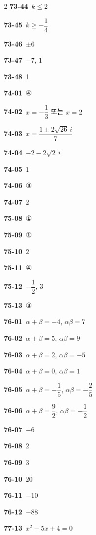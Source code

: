 \documentclass[10pt,a4paper]{article}
\begin{document}
\begin{multicols}{2}
\noindent\textbf{73-44}\ $k\le 2$\par
\noindent\textbf{73-45}\ $k\ge -\dfrac{1}{4}$\par
\noindent\textbf{73-46}\ $\pm6$\par
\noindent\textbf{73-47}\ $-7$, 1\par
\noindent\textbf{73-48}\ 1\par
\noindent\textbf{74-01}\ ④\par
\noindent\textbf{74-02}\ $x=-\dfrac{1}{3}$ 또는 $x=2$\par
\noindent\textbf{74-03}\ $x=\dfrac{1\pm 2\sqrt{26}\,i}{7}$\par
\noindent\textbf{74-04}\ $-2-2\sqrt{2}\,i$\par
\noindent\textbf{74-05}\ $1$\par
\noindent\textbf{74-06}\ ③\par
\noindent\textbf{74-07}\ $2$\par
\noindent\textbf{75-08}\ ①\par
\noindent\textbf{75-09}\ ①\par
\noindent\textbf{75-10}\ $2$\par
\noindent\textbf{75-11}\ ④\par
\noindent\textbf{75-12}\ $-\dfrac{1}{2}$, $3$\par
\noindent\textbf{75-13}\ ③\par
\noindent\textbf{76-01}\ $\alpha+\beta=-4$, $\alpha\beta=7$\par
\noindent\textbf{76-02}\ $\alpha+\beta=5$, $\alpha\beta=9$\par
\noindent\textbf{76-03}\ $\alpha+\beta=2$, $\alpha\beta=-5$\par
\noindent\textbf{76-04}\ $\alpha+\beta=0$, $\alpha\beta=1$\par
\noindent\textbf{76-05}\ $\alpha+\beta=-\dfrac{1}{5}$, $\alpha\beta=-\dfrac{2}{5}$\par
\noindent\textbf{76-06}\ $\alpha+\beta=\dfrac{9}{2}$, $\alpha\beta=-\dfrac{1}{2}$\par
\noindent\textbf{76-07}\ $-6$\par
\noindent\textbf{76-08}\ $2$\par
\noindent\textbf{76-09}\ $3$\par
\noindent\textbf{76-10}\ $20$\par
\noindent\textbf{76-11}\ $-10$\par
\noindent\textbf{76-12}\ $-88$\par
\noindent\textbf{77-13}\ $x^2-5x+4=0$\par

\end{multicols}
\end{document}
